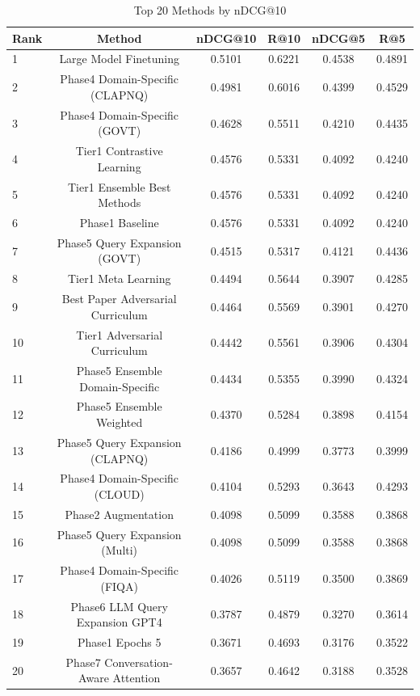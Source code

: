 \documentclass[11pt]{article}
\begin{document}
\begin{table}[t]
\centering
\caption{Top 20 Methods by nDCG@10}
\label{tab:top_methods_complete}
\small
\begin{tabular}{lccccc}
\toprule
\textbf{Rank} & \textbf{Method} & \textbf{nDCG@10} & \textbf{R@10} & \textbf{nDCG@5} & \textbf{R@5} \\
\midrule
1 & Large Model Finetuning & 0.5101 & 0.6221 & 0.4538 & 0.4891 \\
2 & Phase4 Domain-Specific (CLAPNQ) & 0.4981 & 0.6016 & 0.4399 & 0.4529 \\
3 & Phase4 Domain-Specific (GOVT) & 0.4628 & 0.5511 & 0.4210 & 0.4435 \\
4 & Tier1 Contrastive Learning & 0.4576 & 0.5331 & 0.4092 & 0.4240 \\
5 & Tier1 Ensemble Best Methods & 0.4576 & 0.5331 & 0.4092 & 0.4240 \\
6 & Phase1 Baseline & 0.4576 & 0.5331 & 0.4092 & 0.4240 \\
7 & Phase5 Query Expansion (GOVT) & 0.4515 & 0.5317 & 0.4121 & 0.4436 \\
8 & Tier1 Meta Learning & 0.4494 & 0.5644 & 0.3907 & 0.4285 \\
9 & Best Paper Adversarial Curriculum & 0.4464 & 0.5569 & 0.3901 & 0.4270 \\
10 & Tier1 Adversarial Curriculum & 0.4442 & 0.5561 & 0.3906 & 0.4304 \\
11 & Phase5 Ensemble Domain-Specific & 0.4434 & 0.5355 & 0.3990 & 0.4324 \\
12 & Phase5 Ensemble Weighted & 0.4370 & 0.5284 & 0.3898 & 0.4154 \\
13 & Phase5 Query Expansion (CLAPNQ) & 0.4186 & 0.4999 & 0.3773 & 0.3999 \\
14 & Phase4 Domain-Specific (CLOUD) & 0.4104 & 0.5293 & 0.3643 & 0.4293 \\
15 & Phase2 Augmentation & 0.4098 & 0.5099 & 0.3588 & 0.3868 \\
16 & Phase5 Query Expansion (Multi) & 0.4098 & 0.5099 & 0.3588 & 0.3868 \\
17 & Phase4 Domain-Specific (FIQA) & 0.4026 & 0.5119 & 0.3500 & 0.3869 \\
18 & Phase6 LLM Query Expansion GPT4 & 0.3787 & 0.4879 & 0.3270 & 0.3614 \\
19 & Phase1 Epochs 5 & 0.3671 & 0.4693 & 0.3176 & 0.3522 \\
20 & Phase7 Conversation-Aware Attention & 0.3657 & 0.4642 & 0.3188 & 0.3528 \\
\bottomrule
\end{tabular}
\end{table}
\end{document}
